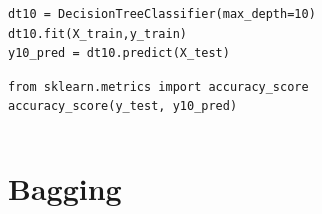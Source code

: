 

\begin{frame}[fragile]\frametitle{}
\tiny	
\begin{lstlisting}
dt10 = DecisionTreeClassifier(max_depth=10)
dt10.fit(X_train,y_train)
y10_pred = dt10.predict(X_test)
\end{lstlisting} 

\begin{lstlisting}
from sklearn.metrics import accuracy_score
accuracy_score(y_test, y10_pred)
\end{lstlisting} 


\begin{lstlisting}

\end{lstlisting} 

\end{frame}
\section{Bagging}



